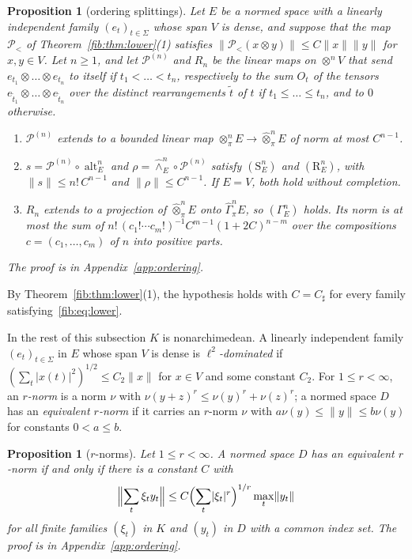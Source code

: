 \documentclass[11pt]{amsart}
\newtheorem{proposition}[theorem]{Proposition}
\theoremstyle{definition}
\theoremstyle{remark}
\numberwithin{equation}{section}
\newcommand{\abs}[1]{\lvert #1\rvert}
\newcommand{\norm}[1]{\lVert #1\rVert}
\theoremstyle{plain}
\theoremstyle{definition}
\theoremstyle{plain}
\newcommand{\cP}{\mathcal P}
\begin{document}
\begin{proposition}[ordering splittings]\label{spl:prop:ordering}
Let $E$ be a normed space with a linearly independent family $(e_t)_{t\in\Sigma}$ whose span $V$ is dense, and suppose
that the map $\cP_<$ of Theorem~\ref{fib:thm:lower}(1) satisfies $\norm{\cP_<(x\otimes y)}\le C\norm x\norm y$ for
$x,y\in V$. Let $n\ge1$, and let $\cP^{(n)}$ and $R_n$ be the linear maps on $\otimes^nV$ that send
$e_{t_1}\otimes\dots\otimes e_{t_n}$ to itself if $t_1<\dots<t_n$, respectively to the sum $O_t$ of the tensors
$e_{\tilde t_1}\otimes\dots\otimes e_{\tilde t_n}$ over the distinct rearrangements $\tilde t$ of $t$ if $t_1\le\dots\le t_n$, and to $0$
otherwise.
\begin{enumerate}
\item $\cP^{(n)}$ extends to a bounded linear map $\otimes^n_\pi E\to\widehat\otimes^n_\pi E$ of norm at most $C^{n-1}$.
\item $s=\cP^{(n)}\circ\operatorname{alt}^n_E$ and $\rho=\widehat\wedge^n_E\circ\cP^{(n)}$ satisfy $(\mathrm S^n_E)$ and
$(\mathrm R^n_E)$, with $\norm s\le n!\,C^{n-1}$ and $\norm\rho\le C^{n-1}$. If $E=V$, both hold without completion.
\item $R_n$ extends to a projection of $\widehat\otimes^n_\pi E$ onto $\widehat\Gamma^n_\pi E$, so $(\Gamma^n_E)$ holds.
Its norm is at most the sum of $n!\,(c_1!\cdots c_m!)^{-1}C^{m-1}(1+2C)^{n-m}$ over the compositions
$c=(c_1,\dots,c_m)$ of $n$ into positive parts.
\end{enumerate}
The proof is in Appendix~\ref{app:ordering}.
\end{proposition}

By Theorem~\ref{fib:thm:lower}(1), the hypothesis holds with $C=C_\sharp$ for every family satisfying~\eqref{fib:eq:lower}.

In the rest of this subsection $K$ is nonarchimedean. A linearly independent family $(e_t)_{t\in\Sigma}$ in $E$ whose span
$V$ is dense is \emph{$\ell^2$-dominated} if $(\sum_t\abs{x(t)}^2)^{1/2}\le C_2\norm x$ for $x\in V$ and some constant
$C_2$. For $1\le r<\infty$, an \emph{$r$-norm} is a norm $\nu$ with $\nu(y+z)^r\le\nu(y)^r+\nu(z)^r$; a normed space $D$ has an \emph{equivalent
$r$-norm} if it carries an $r$-norm $\nu$ with $a\nu(y)\le\norm y\le b\nu(y)$ for constants $0<a\le b$.

\begin{proposition}[$r$-norms]\label{spl:prop:r-norm}
Let $1\le r<\infty$. A normed space $D$ has an equivalent $r$-norm if and only if there is a constant $C$ with
\begin{equation}\label{spl:eq:r-norm}
 \Bigl\lVert\sum_t\xi_ty_t\Bigr\rVert\le C\Bigl(\sum_t\abs{\xi_t}^r\Bigr)^{1/r}\max_t\norm{y_t}
\end{equation}
for all finite families $(\xi_t)$ in $K$ and $(y_t)$ in $D$ with a common index set. The proof is in
Appendix~\ref{app:ordering}.
\end{proposition}
\end{document}
